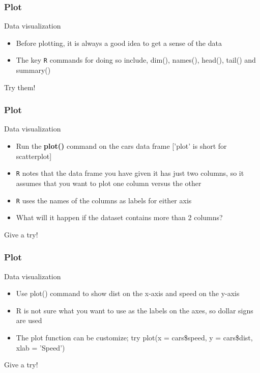 \documentclass{beamer}
\begin{document}
\begin{frame}[fragile]
	\frametitle{Plot}
	\centering \Large Data visualization
	\begin{itemize}
		\small
		\item Before plotting, it is always a good idea to get a sense of the data 
		\item The key \texttt{R} commands for doing so include, dim(), names(), head(), tail() and summary()
	\end{itemize}

	\begin{center} \normalsize Try them! \end{center}
\end{frame}


\begin{frame}[fragile]
	\frametitle{Plot}
	\centering \Large Data visualization
	\begin{itemize}
		\small
		\item Run the \textbf{plot()} command on the cars data frame \tiny ['plot' is short for scatterplot] \small
		\vspace{10pt}
		\pause
		\item \texttt{R} notes that the data frame you have given it has just two columns, so it assumes that you want to plot one column versus the other
		\item \texttt{R} uses the names of the columns as labels for either axis
		\vspace{10pt}
		\pause
		\item What will it happen if the dataset contains more than 2 columns?
	\end{itemize}
	
	\vspace{20pt}
	\begin{center} Give a try! \end{center}

\end{frame}



\begin{frame}[fragile]
	\frametitle{Plot}
	\centering \Large Data visualization
	\begin{itemize}
		\small
		\item Use plot() command to show dist on the x-axis and speed on the y-axis
	\pause
		\item R is not sure what you want to use as the labels on the axes, so dollar signs are used
		\item The plot function can be customize; try plot(x = cars\$speed, y = cars\$dist, xlab = 'Speed') 
	\end{itemize}
	
	\vspace{20pt}
	\begin{center} Give a try! \end{center}
\end{frame}
\end{document}
